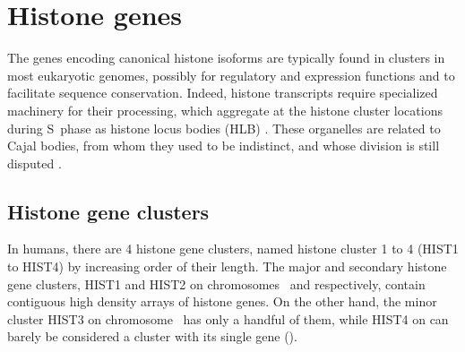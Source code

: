 \documentclass[10pt,a4paper,twocolumn,article]{memoir}
\begin{document}
  \section{Histone genes}

    The genes encoding canonical histone isoforms are typically found in clusters in most
    eukaryotic genomes, possibly for regulatory and expression functions and to facilitate
    sequence conservation. Indeed, histone transcripts require specialized machinery for
    their processing, which aggregate at the histone cluster locations during S~phase as
    histone locus bodies (HLB) \citep{human-first-HLB-report, human-HLB-report-GhuleEtAl2008}.
    These organelles are related to Cajal bodies, from whom they used to be indistinct, and
    whose division is still disputed \citep{CB-HLB-review}.

    \subsection{Histone gene clusters}
      In humans, there are 4 histone gene clusters, named histone cluster 1 to 4 (HIST1 to HIST4)
      by increasing order of their length. The major and secondary histone gene clusters,
      HIST1 and HIST2 on chromosomes~\HISTOneLocus{} and \HISTTwoLocus{} respectively,
      contain contiguous high density arrays of histone genes. On the other hand, the minor
      cluster HIST3 on chromosome~\HISTThreeLocus{} has only a handful of them, while HIST4
      on \HISTFourLocus{} can barely be considered a cluster with its single gene
      ().
\end{document}
